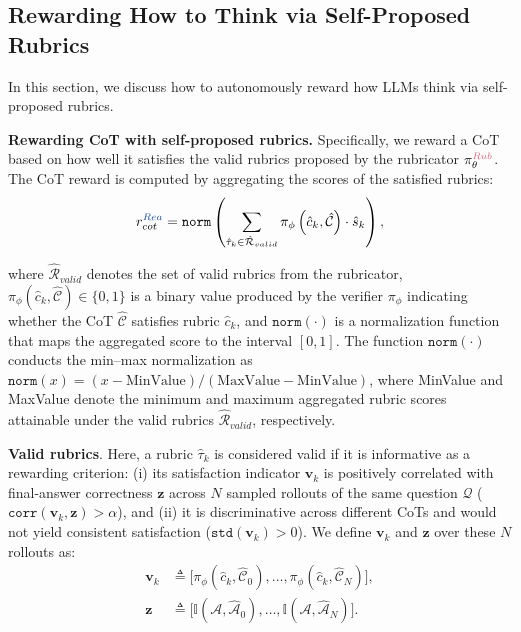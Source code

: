 \subsection{Rewarding How to Think via Self-Proposed Rubrics} \label{sec:reasoner_reward}
In this section, we discuss how to autonomously reward how LLMs think via self-proposed rubrics. 

\textbf{Rewarding CoT with self-proposed rubrics.} Specifically, we reward a CoT based on how well it satisfies the valid rubrics proposed by the rubricator $\pi_{\theta}^{\text{\textcolor{rubricator}{$Rub$}}}$.
The CoT reward is computed by aggregating the scores of the satisfied rubrics:
\begin{equation}
    r_{cot}^{\text{\textcolor{reasoner}{$Rea$}}}=\texttt{norm}\left(\sum_{\hat{\tau}_{k} \in \hat{\mathcal{R}}_{valid}}\pi_\phi \left(\hat c_k, \hat{\mathcal{C}}\right)\cdot\hat s_k\right),
\end{equation}

where $\hat{\mathcal{R}}_{valid}$ denotes the set of valid rubrics from the rubricator, $\pi_\phi(\hat c_k, \hat{\mathcal{C}})\in\{0,1\}$ is a binary value produced by the verifier $\pi_\phi$ indicating whether the CoT $\hat{\mathcal{C}}$ satisfies rubric $\hat c_k$, and $\texttt{norm}(\cdot)$ is a normalization function that maps the aggregated score to the interval $[0,1]$. The function $\texttt{norm}(\cdot)$ conducts the min–max normalization as $\texttt{norm}(x) = (x-\text{MinValue}) / (\text{MaxValue}-\text{MinValue})$, where MinValue and MaxValue denote the minimum and maximum aggregated rubric scores attainable under the valid rubrics $\hat{\mathcal{R}}_{valid}$, respectively.

\textbf{Valid rubrics}. Here, a rubric $\hat{\tau}_k$ is considered valid if it is informative as a rewarding criterion: 
(i) its satisfaction indicator $\mathbf v_k$ is positively correlated with final-answer correctness $\mathbf z$
across $N$ sampled rollouts of the same question $\mathcal Q$ (\ie $\mathtt{corr}(\mathbf v_k,\mathbf z)>\alpha$),
and (ii) it is discriminative across different CoTs and would not yield consistent satisfaction (\ie $\mathtt{std}(\mathbf v_k)>0$). 
We define $\mathbf v_k$ and $\mathbf z$ over these $N$ rollouts as:
\begin{equation}
\begin{aligned}
\mathbf v_k &\triangleq \Big[\pi_\phi(\hat c_k,\hat{\mathcal C}_0),\ldots,\pi_\phi(\hat c_k,\hat{\mathcal C}_N)\Big],\\
\mathbf z   &\triangleq \Big[\mathbb{I}(\mathcal A,\hat{\mathcal A}_0),\ldots,\mathbb{I}(\mathcal A,\hat{\mathcal A}_N)\Big].
\end{aligned}
\end{equation}

